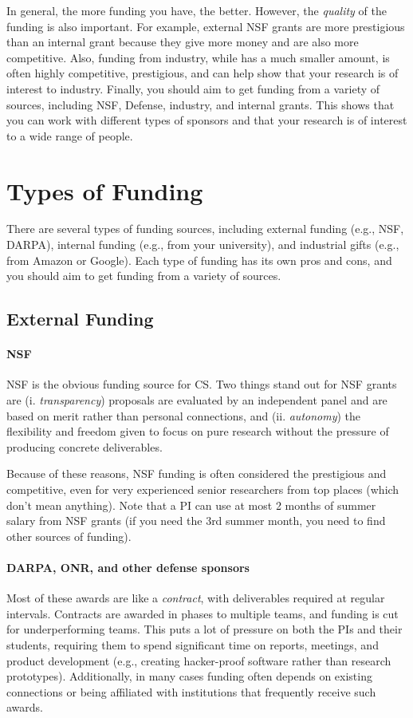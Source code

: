 \documentclass[oneside,11pt,dvipsnames]{book}
\begin{document}
In general, the more funding you have, the better.  However, the \emph{quality} of the funding is also important.  For example, external NSF grants are more prestigious than an internal grant because they give more money and are also more competitive.  Also, funding from industry, while has a much smaller amount, is often highly competitive, prestigious, and can help show that your research is of interest to industry.  Finally, you should aim to get funding from a variety of sources, including NSF, Defense, industry, and internal grants.  This shows that you can work with different types of sponsors and that your research is of interest to a wide range of people.

\section{Types of Funding}\label{sec:fuding-types}
There are several types of funding sources, including external funding (e.g., NSF, DARPA), internal funding (e.g., from your university), and industrial gifts (e.g., from Amazon or Google).  Each type of funding has its own pros and cons, and you should aim to get funding from a variety of sources.
\subsection{External Funding}\label{sec:external}
\paragraph{NSF} NSF is the obvious funding source for CS. 
Two things stand out for NSF grants are (i. \emph{transparency}) proposals are evaluated by an independent panel and are based on merit rather than personal connections, and (ii. \emph{autonomy}) the flexibility and freedom given to focus on pure research without the pressure of producing concrete deliverables.  

Because of these reasons, NSF funding is often considered the prestigious and competitive, even for very experienced senior researchers from top places (which don't mean anything). Note that a PI can use at most 2 months of summer salary from NSF grants (if you need the 3rd summer month, you need to find other sources of funding).

\paragraph{DARPA, ONR, and other defense sponsors} Most of these awards are like a \emph{contract}, with deliverables required at regular intervals. Contracts are awarded in phases to multiple teams, and funding is cut for underperforming teams. This puts a lot of pressure on both the PIs and their students, requiring them to spend significant time on reports, meetings, and product development (e.g., creating hacker-proof software rather than research prototypes). Additionally, in many cases funding often depends on existing connections or being affiliated with institutions that frequently receive such awards.
\end{document}
